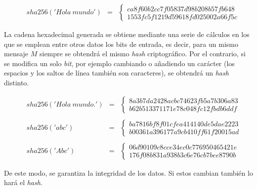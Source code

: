 \documentclass{article}
\begin{document}
        \begin{figure}[H]
        \centering
            $\begin{array}{rcl}
                 sha256('Hola \ mundo') & = & \left \{
                \begin{array}{c}
                    ca8f60b2cc7f05837d98b208b57fb648 \\
                    1553fc5f1219d59618fd025002a66f5c
                \end{array}
                \right .
            \end{array}$
        \end{figure}
        
    La cadena hexadecimal generada se obtiene mediante una serie de cálculos en los que se emplean entre otros datos los bits de entrada, es decir, para un mismo mensaje $M$ siempre se obtendrá el mismo \textit{hash} criptográfico. Por el contrario, si se modifica un solo \textit{bit}, por ejemplo cambiando o añadiendo un carácter (los espacios y los saltos de línea también son caracteres), se obtendrá un \textit{hash} distinto.
        \begin{figure}[H]
        \centering
            $\begin{array}{rcl}
                sha256('Hola \ mundo.') & = & \left \{
                \begin{array}{c}
                    8a3b7da2428acbc74623fb5a7b306a83 \\
                    b62b513371171e78c048fc12fbdb6ddf
                \end{array}
                \right . \\
                 & \\
                 sha256('abc') & = & \left \{
                \begin{array}{c}
                    ba7816bf8f01cfea414140de5dae2223 \\
                    b00361a396177a9cb410ff61f20015ad
                \end{array}
                \right . \\
                 & \\
                 sha256('Abc') & = & \left \{
                \begin{array}{c}
                    06d90109c8cce34ec0c776950465421e \\
                    176f08b831a938b3c6e76cb7bee8790b
                \end{array}
                \right .
            \end{array}$
        \end{figure}
    De este modo, se garantiza la integridad de los datos. Si estos cambian también lo hará el \textit{hash}.
\end{document}
